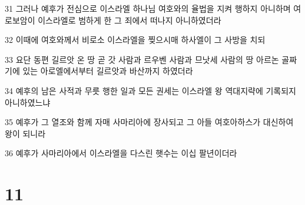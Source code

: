 \par 31 그러나 예후가 전심으로 이스라엘 하나님 여호와의 율법을 지켜 행하지 아니하며 여로보암이 이스라엘로 범하게 한 그 죄에서 떠나지 아니하였더라
\par 32 이때에 여호와께서 비로소 이스라엘을 찢으시매 하사엘이 그 사방을 치되
\par 33 요단 동편 길르앗 온 땅 곧 갓 사람과 르우벤 사람과 므낫세 사람의 땅 아르논 골짜기에 있는 아로엘에서부터 길르앗과 바산까지 하였더라
\par 34 예후의 남은 사적과 무릇 행한 일과 모든 권세는 이스라엘 왕 역대지략에 기록되지 아니하였느냐
\par 35 예후가 그 열조와 함께 자매 사마리아에 장사되고 그 아들 여호아하스가 대신하여 왕이 되니라
\par 36 예후가 사마리아에서 이스라엘을 다스린 햇수는 이십 팔년이더라

\chapter{11}

